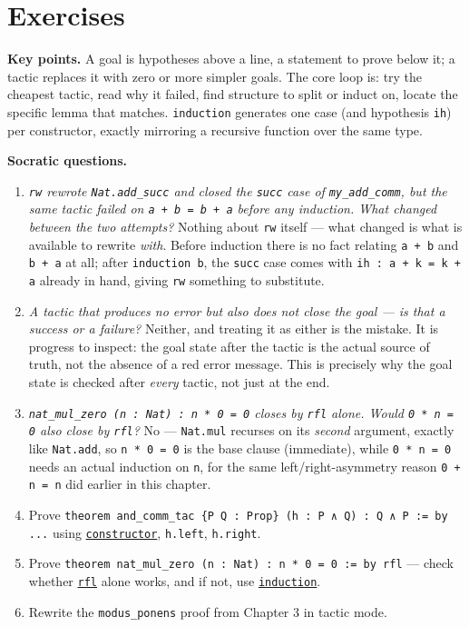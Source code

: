 \section{Exercises}\label{sec:04-tactics:06-exercises:1}

\textbf{Key points.} A goal is hypotheses above a line, a statement to prove below it; a tactic replaces it with zero or more simpler goals. The core loop is: try the cheapest tactic, read why it failed, find structure to split or induct on, locate the specific lemma that matches. \texttt{induction} generates one case (and hypothesis \texttt{ih}) per constructor, exactly mirroring a recursive function over the same type.

\textbf{Socratic questions.}

\begin{enumerate}
\def\labelenumi{\arabic{enumi}.}
\item
  \emph{\texttt{rw} rewrote \texttt{Nat.add\_\allowbreak{}succ} and closed the \texttt{succ} case of \texttt{my\_\allowbreak{}add\_\allowbreak{}comm}, but the same tactic failed on \texttt{a + b = b + a} before any induction. What changed between the two attempts?} Nothing about \texttt{rw} itself --- what changed is what is available to rewrite \emph{with}. Before induction there is no fact relating \texttt{a + b} and \texttt{b + a} at all; after \texttt{induction b}, the \texttt{succ} case comes with \texttt{ih : a + k = k + a} already in hand, giving \texttt{rw} something to substitute.
\item
  \emph{A tactic that produces no error but also does not close the goal --- is that a success or a failure?} Neither, and treating it as either is the mistake. It is progress to inspect: the goal state after the tactic is the actual source of truth, not the absence of a red error message. This is precisely why the goal state is checked after \emph{every} tactic, not just at the end.
\item
  \emph{\texttt{nat\_\allowbreak{}mul\_\allowbreak{}zero (n : Nat) : n * 0 = 0} closes by \texttt{rfl} alone. Would \texttt{0 * n = 0} also close by \texttt{rfl}?} No --- \texttt{Nat.mul} recurses on its \emph{second} argument, exactly like \texttt{Nat.add}, so \texttt{n * 0 = 0} is the base clause (immediate), while \texttt{0 * n = 0} needs an actual induction on \texttt{n}, for the same left/right-asymmetry reason \texttt{0 + n = n} did earlier in this chapter.
\item
  Prove \texttt{theorem and\_\allowbreak{}comm\_\allowbreak{}tac \{P Q : Prop\} (h : P ∧ Q) : Q ∧ P := by ...} using \href{https://lean-lang.org/doc/reference/latest/Tactic-Proofs/Tactic-Reference/}{\texttt{constructor}}, \texttt{h.left}, \texttt{h.right}.
\item
  Prove \texttt{theorem nat\_\allowbreak{}mul\_\allowbreak{}zero (n : Nat) : n * 0 = 0 := by rfl} --- check whether \href{https://lean-lang.org/doc/reference/latest/Tactic-Proofs/Tactic-Reference/}{\texttt{rfl}} alone works, and if not, use \href{https://lean-lang.org/doc/reference/latest/Tactic-Proofs/Tactic-Reference/}{\texttt{induction}}.
\item
  Rewrite the \texttt{modus\_\allowbreak{}ponens} proof from Chapter 3 in tactic mode.
\end{enumerate}

